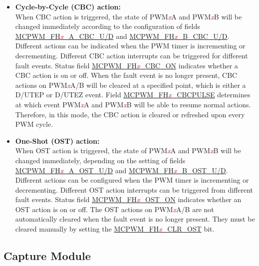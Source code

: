 \documentclass[main\_\_EN.tex]{subfiles}
\begin{document}
\begin{itemize}
    \item {\bfseries Cycle-by-Cycle (CBC) action:}\\
    When CBC action is triggered, the state of PWM\textcolor{red}{\it{x}}A and PWM\textcolor{red}{\it{x}}B will be changed immediately according to the configuration of fields \hyperref[fielddesc:MCPWMFH0ACBCU]{MCPWM\_FH\textcolor{red}{\it{x}}\_A\_CBC\_U/D} and \hyperref[fielddesc:MCPWMFH0BCBCU]{MCPWM\_FH\textcolor{red}{\it{x}}\_B\_CBC\_U/D}. Different actions can be indicated when the PWM timer is incrementing or decrementing. Different CBC action interrupts can be triggered for different fault events. Status field \hyperref[fielddesc:MCPWMFH0CBCON]{MCPWM\_FH\textcolor{red}{\it{x}}\_CBC\_ON} indicates whether a CBC action is on or off.
   When the fault event is no longer present, CBC actions on PWM\textcolor{red}{\it{x}}A/B will be cleared at a specified point, which is either a D/UTEP or D/UTEZ event. Field \hyperref[fielddesc:MCPWMFH0CBCPULSE]{MCPWM\_FH\textcolor{red}{\it{x}}\_CBCPULSE} determines at which event PWM\textcolor{red}{\it{x}}A and PWM\textcolor{red}{\it{x}}B will be able to resume normal actions. Therefore, in this mode, the CBC action is cleared or refreshed upon every PWM cycle. 
    \item {\bfseries One-Shot (OST) action:}\\
	When OST action is triggered, the state of PWM\textcolor{red}{\it{x}}A and PWM\textcolor{red}{\it{x}}B will be changed immediately, depending on the setting of fields \hyperref[fielddesc:MCPWMFH0AOSTU]{MCPWM\_FH\textcolor{red}{\it{x}}\_A\_OST\_U/D} and \hyperref[fielddesc:MCPWMFH0BOSTU]{MCPWM\_FH\textcolor{red}{\it{x}}\_B\_OST\_U/D}. Different actions can be configured when the PWM timer is incrementing or decrementing. Different OST action interrupts can be triggered from different fault events. Status field \hyperref[fielddesc:MCPWMFH0OSTON]{MCPWM\_FH\textcolor{red}{\it{x}}\_OST\_ON} indicates whether an OST action is on or off.
    The OST actions on PWM\textcolor{red}{\it{x}}A/B are not automatically cleared when the fault event is no longer present. They must be cleared manually by setting the \hyperref[fielddesc:MCPWMFH0CLROST]{MCPWM\_FH\textcolor{red}{\it{x}}\_CLR\_OST} bit.
\end{itemize}

\subsection{Capture Module}
\end{document}
